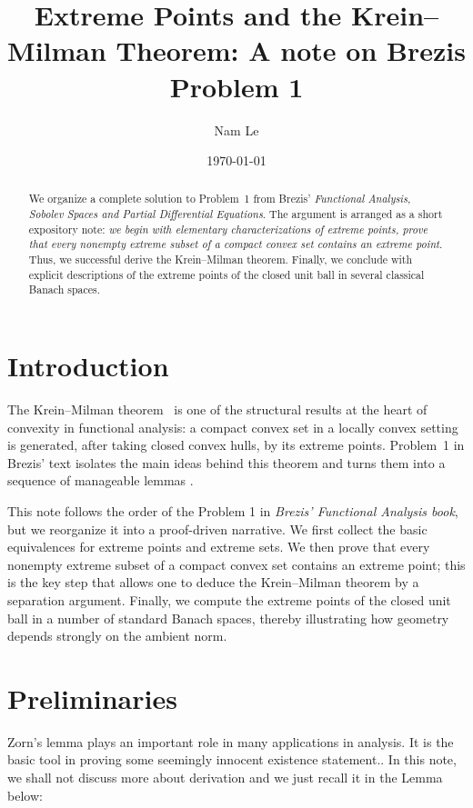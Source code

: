 \documentclass[reqno]{amsart}
\title{Extreme Points and the Krein--Milman Theorem: A note on Brezis Problem 1}
\author{Nam Le}
\date{\today}
\theoremstyle{definition}
\begin{document}
\begin{abstract}
We organize a complete solution to Problem~1 from Brezis' \emph{Functional Analysis, Sobolev Spaces and Partial Differential Equations}. The argument is arranged as a short expository note: \textit{we begin with elementary characterizations of extreme points, prove that every nonempty extreme subset of a compact convex set contains an extreme point}. Thus, we successful derive the Krein--Milman theorem. Finally, we conclude with explicit descriptions of the extreme points of the closed unit ball in several classical Banach spaces.
\end{abstract}

\maketitle

\section{Introduction}
The Krein--Milman theorem~\citep{rudin1991} is one of the structural results at the heart of convexity in functional analysis: a compact convex set in a locally convex setting is generated, after taking closed convex hulls, by its extreme points. Problem~1 in Brezis' text isolates the main ideas behind this theorem and turns them into a sequence of manageable lemmas \citep{brezis2011}.

This note follows the order of the Problem 1 in \textit{Brezis' Functional Analysis book}, but we reorganize it into a proof-driven narrative. We first collect the basic equivalences for extreme points and extreme sets. We then prove that every nonempty extreme subset of a compact convex set contains an extreme point; this is the key step that allows one to deduce the Krein--Milman theorem by a separation argument. Finally, we compute the extreme points of the closed unit ball in a number of standard Banach spaces, thereby illustrating how geometry depends strongly on the ambient norm.

\section{Preliminaries}

Zorn's lemma plays an important role in many applications in analysis. It is the basic tool in proving some seemingly innocent existence statement.\citep{brezis2011}. In this note, we shall not discuss more about derivation and we just recall it in the Lemma below: 
\end{document}
